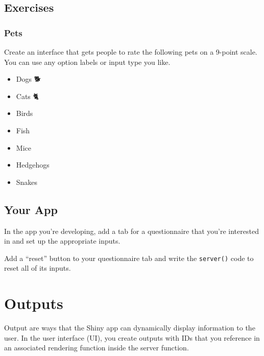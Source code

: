 \documentclass[
  oneside]{book}
\providecommand{\tightlist}{%
  \setlength{\itemsep}{0pt}\setlength{\parskip}{0pt}}
\begin{document}
\hypertarget{exercises-inputs}{%
\section{Exercises}\label{exercises-inputs}}

\hypertarget{pets}{%
\subsection{Pets}\label{pets}}

Create an interface that gets people to rate the following pets on a 9-point scale. You can use any option labels or input type you like.

\begin{itemize}
\tightlist
\item
  Dogs 🐕\\
\item
  Cats 🐈\\
\item
  Birds 🦜\\
\item
  Fish 🐠\\
\item
  Mice 🐁\\
\item
  Hedgehogs 🦔\\
\item
  Snakes 🐍
\end{itemize}

\hypertarget{your-app-inputs}{%
\section{Your App}\label{your-app-inputs}}

In the app you're developing, add a tab for a questionnaire that you're interested in and set up the appropriate inputs.

Add a ``reset'' button to your questionnaire tab and write the \texttt{server}\texttt{()} code to reset all of its inputs.

\hypertarget{outputs}{%
\chapter{Outputs}\label{outputs}}

Output are ways that the Shiny app can dynamically display information to the user. In the user interface (UI), you create outputs with IDs that you reference in an associated rendering function inside the server function.
\end{document}
